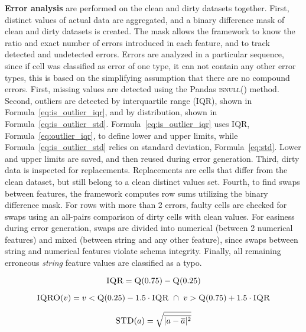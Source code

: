 \textbf{Error analysis} are performed on the clean and dirty datasets together.
First, distinct values of actual data are aggregated, and a binary difference mask of clean and dirty datasets is created.
The mask allows the framework to know the ratio and exact number of errors introduced in each feature, and to track detected and undetected errors. 
Errors are analyzed in a particular sequence, since if cell was classified as error of one type, it can not contain any other error types, this is based on the simplifying assumption that there are no compound errors.
First, missing values are detected using the Pandas \textsc{isnull()} method. 
Second, outliers are detected by interquartile range (IQR), shown in Formula~\ref{eq:is_outlier_iqr}, and by distribution, shown in Formula~\ref{eq:is_outlier_std}. 
Formula~\ref{eq:is_outlier_iqr} uses IQR, Formula~\ref{eq:outlier_iqr}, to define lower and upper limits, while Formula~\ref{eq:is_outlier_std} relies on standard deviation, Formula~\ref{eq:std}. 
Lower and upper limits are saved, and then reused during error generation. 
Third, dirty data is inspected for replacements. 
Replacements are cells that differ from the clean dataset, but still belong to a clean distinct values set.
Fourth, to find swaps between features, the framework computes row sums utilizing the binary difference mask. 
For rows with more than 2 errors, faulty cells are checked for swaps using an all-pairs comparison of dirty cells with clean values. 
For easiness during error generation, swaps are divided into numerical (between 2 numerical features) and mixed (between string and any other feature), since swaps between string and numerical features violate schema integrity.
Finally, all remaining erroneous \emph{string} feature values are classified as a typo.

\begin{equation}
\label{eq:outlier_iqr}
\textsc{IQR} = \textsc{Q}(0.75) - \textsc{Q}(0.25)  
\end{equation}

\begin{equation}
\label{eq:is_outlier_iqr}
\textsc{IQRO}(v) =  v < \textsc{Q}(0.25) - 1.5 \cdot \textsc{IQR} \ \cap \  v >  \textsc{Q}(0.75) + 1.5 \cdot \textsc{IQR}
\end{equation}

\begin{equation}
    \label{eq:std}
    \textsc{STD}(a) = \sqrt{\overline{|a - \overline{a}|^2}} 
\end{equation}

